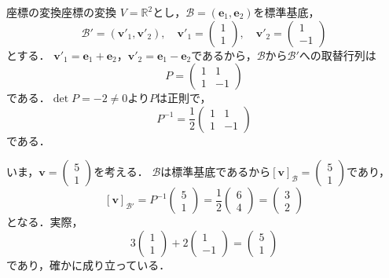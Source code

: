 \begin{example}{座標の変換}{座標の変換}
  $V = \mathbb{R}^2$とし，$\mathcal{B} = (\bm{e}_1, \bm{e}_2)$を標準基底，
  \[
    \mathcal{B}' = (\bm{v}'_1, \bm{v}'_2), \quad
    \bm{v}'_1 = \begin{pmatrix} 1 \\ 1 \end{pmatrix}, \quad
    \bm{v}'_2 = \begin{pmatrix} 1 \\ -1 \end{pmatrix}
  \]
  とする．
  $\bm{v}'_1 = \bm{e}_1 + \bm{e}_2$，$\bm{v}'_2 = \bm{e}_1 - \bm{e}_2$であるから，$\mathcal{B}$から$\mathcal{B}'$への取替行列は
  \[
    P = \begin{pmatrix} 1 & 1 \\ 1 & -1 \end{pmatrix}
  \]
  である．$\det P = -2 \ne 0$より$P$は正則で，
  \[
    P^{-1} = \frac{1}{2}\begin{pmatrix} 1 & 1 \\ 1 & -1 \end{pmatrix}
  \]
  である．

  いま，$\bm{v} = \begin{pmatrix} 5 \\ 1 \end{pmatrix}$を考える．
  $\mathcal{B}$は標準基底であるから$[\bm{v}]_{\mathcal{B}} = \begin{pmatrix} 5 \\ 1 \end{pmatrix}$であり，
  \[
    [\bm{v}]_{\mathcal{B}'}
    = P^{-1}\begin{pmatrix} 5 \\ 1 \end{pmatrix}
    = \frac{1}{2}\begin{pmatrix} 6 \\ 4 \end{pmatrix}
    = \begin{pmatrix} 3 \\ 2 \end{pmatrix}
  \]
  となる．実際，
  \[
    3\begin{pmatrix} 1 \\ 1 \end{pmatrix} + 2\begin{pmatrix} 1 \\ -1 \end{pmatrix}
    = \begin{pmatrix} 5 \\ 1 \end{pmatrix}
  \]
  であり，確かに成り立っている．
\end{example}

